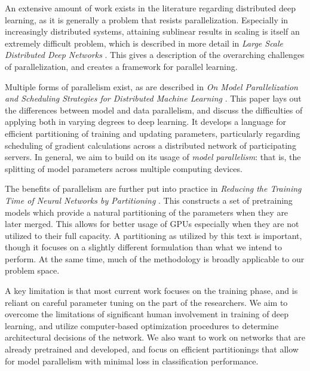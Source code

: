 \documentclass[11pt]{article}
\begin{document}
An extensive amount of work exists in the literature regarding distributed deep learning, as it is generally a problem that resists parallelization.
Especially in increasingly distributed systems, attaining sublinear results in scaling is itself an extremely difficult problem, which is described in more detail in \emph{Large Scale Distributed Deep Networks} \cite{dean2012large}.
This gives a description of the overarching challenges of parallelization, and creates a framework for parallel learning.

Multiple forms of parallelism exist, as are described in \emph{On Model Parallelization and Scheduling Strategies for Distributed Machine Learning} \cite{lee2014model}.
This paper lays out the differences between model and data parallelism, and discuss the difficulties of applying both in varying degrees to deep learning.
It develops a language for efficient partitioning of training and updating parameters, particularly regarding scheduling of gradient calculations across a distributed network of participating servers.
In general, we aim to build on its usage of \emph{model parallelism}: that is, the splitting of model parameters across multiple computing devices.

The benefits of parallelism are further put into practice in \emph{Reducing the Training Time of Neural Networks by Partitioning} \cite{miranda2015reducing}.
This constructs a set of pretraining models which provide a natural partitioning of the parameters when they are later merged.
This allows for better usage of GPUs especially when they are not utilized to their full capacity.
A partitioning as utilized by this text is important, though it focuses on a slightly different formulation than what we intend to perform.
At the same time, much of the methodology is broadly applicable to our problem space.

A key limitation is that most current work focuses on the training phase, and is reliant on careful parameter tuning on the part of the researchers.
We aim to overcome the limitations of significant human involvement in training of deep learning, and utilize computer-based optimization procedures to determine architectural decisions of the network.
We also want to work on networks that are already pretrained and developed, and focus on efficient partitionings that allow for model parallelism with minimal loss in classification performance.

\end{document}
